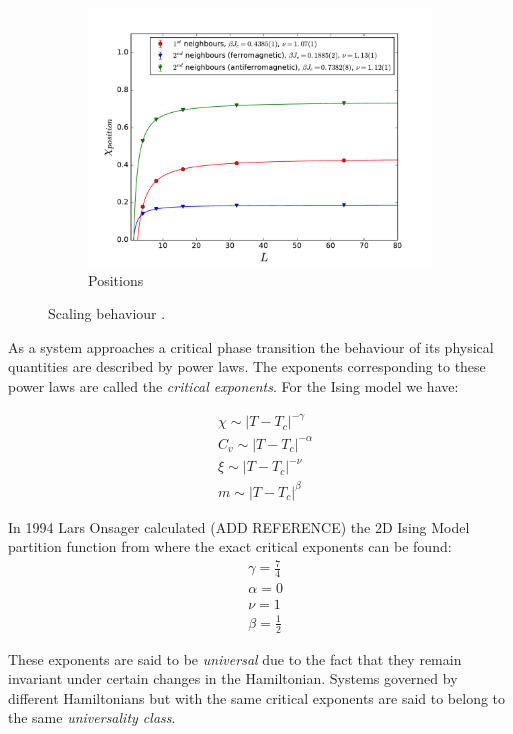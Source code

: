 \documentclass[twoside]{article}
\begin{document}
\begin{multicols}{2}
\begin{figure}[!tpb]
    \begin{subfigure}[b]{0.32\textwidth}
    \includegraphics[width=\textwidth]{images/plot_pos.pdf}
    \caption{Positions}
    \label{scaling_pos}
  \end{subfigure}
  \caption{Scaling behaviour .}
  \label{scaling}
\end{figure}

As a system approaches a critical phase transition the behaviour of its physical quantities are described by power laws. The exponents corresponding to these power laws are called the \emph{critical exponents}. For the Ising model we have:

\begin{align}
&\chi \sim |T-T_c|^{-\gamma} \\
& C_v \sim |T-T_c|^{-\alpha} \\
& \xi \sim |T-T_c|^{-\nu} \\
& m \sim |T-T_c|^{\beta}
\end{align}

In 1994  Lars Onsager calculated (ADD REFERENCE) the 2D Ising Model partition function from where the exact critical exponents can be found:
\begin{align}
&\gamma = \frac{7}{4} \\
&\alpha = 0 \\
&\nu = 1\\
&\beta = \frac{1}{2} 
\end{align}

\noindent These exponents are said to be \emph{universal} due to the fact that they remain invariant under certain changes in the Hamiltonian. Systems governed by different Hamiltonians but with the same critical exponents are said to belong to the same \emph{universality class}. 


\end{multicols}
\end{document}
